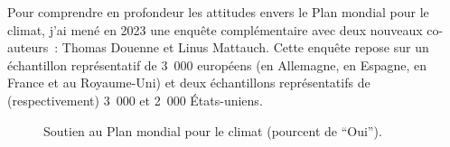 \documentclass[a5paper,french]{memoir}
\begin{document}
Pour comprendre en profondeur les attitudes envers le Plan mondial pour le climat, j'ai mené en 2023 une enquête complémentaire avec deux nouveaux co-auteurs~: Thomas Douenne et Linus Mattauch. Cette enquête repose sur un échantillon représentatif de 3~000 européens (en Allemagne, en Espagne, en France et au Royaume-Uni) et deux échantillons représentatifs de (respectivement) 3~000 et 2~000 États-uniens. 

\begin{figure}[h!]
  \caption[Soutien au Plan mondial pour le climat]{Soutien au Plan mondial pour le climat (pourcent de ``Oui'').} 
  \label{fig:gcs_support} 
\end{figure}
\end{document}
